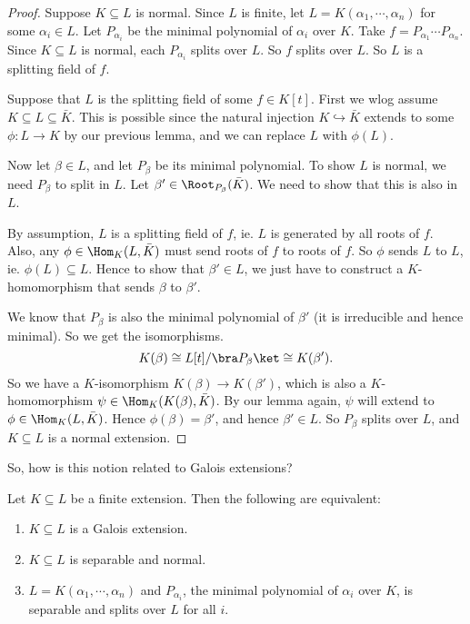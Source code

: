 \documentclass[a4paper]{article}
\begin{document}
\begin{proof}
  Suppose $K\subseteq L$ is normal. Since $L$ is finite, let $L = K(\alpha_1, \cdots, \alpha_n)$ for some $\alpha_i \in L$. Let $P_{\alpha_i}$ be the minimal polynomial of $\alpha_i$ over $K$. Take $f = P_{\alpha_1}\cdots P_{\alpha_n}$. Since $K\subseteq L$ is normal, each $P_{\alpha_i}$ splits over $L$. So $f$ splits over $L$. So $L$ is a splitting field of $f$.

  Suppose that $L$ is the splitting field of some $f \in K[t]$. First we wlog assume $K\subseteq L \subseteq \bar K$. This is possible since the natural injection $K\hookrightarrow \bar{K}$ extends to some $\phi:L \to K$ by our previous lemma, and we can replace $L$ with $\phi(L)$.

  Now let $\beta\in L$, and let $P_{\beta}$ be its minimal polynomial. To show $L$ is normal, we need $P_\beta$ to split in $L$. Let $\beta' \in \Root_{P_\beta}(\bar K)$. We need to show that this is also in $L$.

  By assumption, $L$ is a splitting field of $f$, ie. $L$ is generated by all roots of $f$. Also, any $\phi \in \Hom_K(L, \bar{K})$ must send roots of $f$ to roots of $f$. So $\phi$ sends $L$ to $L$, ie. $\phi(L) \subseteq L$. Hence to show that $\beta' \in L$, we just have to construct a $K$-homomorphism that sends $\beta$ to $\beta'$.

  We know that $P_\beta$ is also the minimal polynomial of $\beta'$ (it is irreducible and hence minimal). So we get the isomorphisms.
  \[
    K(\beta) \cong L[t]/\bra P_\beta\ket \cong K(\beta').
  \]
  So we have a $K$-isomorphism $K(\beta) \to K(\beta')$, which is also a $K$-homomorphism $\psi \in \Hom_K(K(\beta), \bar{K})$. By our lemma again, $\psi$ will extend to $\phi \in \Hom_K(L, \bar{K})$. Hence $\phi(\beta) = \beta'$, and hence $\beta' \in L$. So $P_\beta$ splits over $L$, and $K\subseteq L$ is a normal extension.
\end{proof}

So, how is this notion related to Galois extensions?
\begin{thm}
  Let $K\subseteq L$ be a finite extension. Then the following are equivalent:
  \begin{enumerate}
    \item $K\subseteq L$ is a Galois extension.
    \item $K\subseteq L$ is separable and normal.
    \item $L = K(\alpha_1, \cdots, \alpha_n)$ and $P_{\alpha_i}$, the minimal polynomial of $\alpha_i$ over $K$, is separable and splits over $L$ for all $i$.
  \end{enumerate}
\end{thm}
\end{document}
